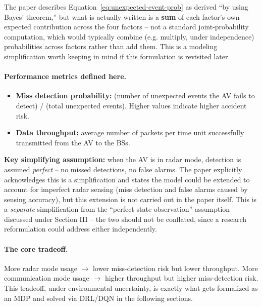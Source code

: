 \documentclass[11pt]{article}
\begin{document}
\begin{remark}
The paper describes Equation~\eqref{eq:unexpected-event-prob} as derived ``by using
Bayes' theorem,'' but what is actually written is a \textbf{sum} of each factor's own
expected contribution across the four factors -- not a standard joint-probability
computation, which would typically combine (e.g. multiply, under independence)
probabilities across factors rather than add them. This is a modeling simplification
worth keeping in mind if this formulation is revisited later.
\end{remark}

\paragraph{Performance metrics defined here.}
\begin{itemize}[leftmargin=1.5em]
    \item \textbf{Miss detection probability:} (number of unexpected events the AV
    fails to detect) / (total unexpected events). Higher values indicate higher
    accident risk.
    \item \textbf{Data throughput:} average number of packets per time unit
    successfully transmitted from the AV to the BSs.
\end{itemize}

\begin{remark}
\textbf{Key simplifying assumption:} when the AV is in radar mode, detection is assumed
\emph{perfect} -- no missed detections, no false alarms. The paper explicitly
acknowledges this is a simplification and states the model could be extended to account
for imperfect radar sensing (miss detection and false alarms caused by sensing
accuracy), but this extension is not carried out in the paper itself. This is a
\emph{separate} simplification from the ``perfect state observation'' assumption
discussed under Section III -- the two should not be conflated, since a research
reformulation could address either independently.
\end{remark}

\paragraph{The core tradeoff.} More radar mode usage $\rightarrow$ lower miss-detection
risk but lower throughput. More communication mode usage $\rightarrow$ higher throughput
but higher miss-detection risk. This tradeoff, under environmental uncertainty, is
exactly what gets formalized as an MDP and solved via DRL/DQN in the following sections.
\end{document}

